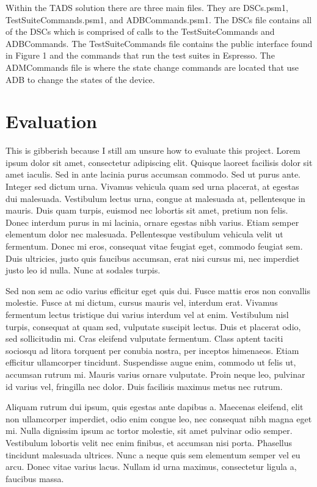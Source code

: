Within the TADS solution there are three main files.  They are DSCs.psm1, TestSuiteCommands.psm1, and ADBCommands.psm1.  The DSCs file contains all of the DSCs which is comprised of calls to the TestSuiteCommands and ADBCommands.  The TestSuiteCommands file contains the public interface found in Figure 1 and the commands that run the test suites in Espresso.  The ADMCommands file is where the state change commands are located that use ADB to change the states of the device. 

\section{Evaluation}
This is gibberish because I still am unsure how to evaluate this project.  Lorem ipsum dolor sit amet, consectetur adipiscing elit. Quisque laoreet facilisis dolor sit amet iaculis. Sed in ante lacinia purus accumsan commodo. Sed ut purus ante. Integer sed dictum urna. Vivamus vehicula quam sed urna placerat, at egestas dui malesuada. Vestibulum lectus urna, congue at malesuada at, pellentesque in mauris. Duis quam turpis, euismod nec lobortis sit amet, pretium non felis. Donec interdum purus in mi lacinia, ornare egestas nibh varius. Etiam semper elementum dolor nec malesuada. Pellentesque vestibulum vehicula velit ut fermentum. Donec mi eros, consequat vitae feugiat eget, commodo feugiat sem. Duis ultricies, justo quis faucibus accumsan, erat nisi cursus mi, nec imperdiet justo leo id nulla. Nunc at sodales turpis.

Sed non sem ac odio varius efficitur eget quis dui. Fusce mattis eros non convallis molestie. Fusce at mi dictum, cursus mauris vel, interdum erat. Vivamus fermentum lectus tristique dui varius interdum vel at enim. Vestibulum nisl turpis, consequat at quam sed, vulputate suscipit lectus. Duis et placerat odio, sed sollicitudin mi. Cras eleifend vulputate fermentum. Class aptent taciti sociosqu ad litora torquent per conubia nostra, per inceptos himenaeos. Etiam efficitur ullamcorper tincidunt. Suspendisse augue enim, commodo ut felis ut, accumsan rutrum mi. Mauris varius ornare vulputate. Proin neque leo, pulvinar id varius vel, fringilla nec dolor. Duis facilisis maximus metus nec rutrum.

Aliquam rutrum dui ipsum, quis egestas ante dapibus a. Maecenas eleifend, elit non ullamcorper imperdiet, odio enim congue leo, nec consequat nibh magna eget mi. Nulla dignissim ipsum ac tortor molestie, sit amet pulvinar odio semper. Vestibulum lobortis velit nec enim finibus, et accumsan nisi porta. Phasellus tincidunt malesuada ultrices. Nunc a neque quis sem elementum semper vel eu arcu. Donec vitae varius lacus. Nullam id urna maximus, consectetur ligula a, faucibus massa.

